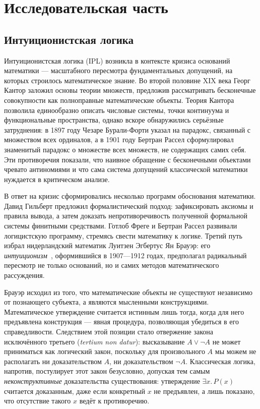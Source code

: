 \documentclass[14pt, russian]{scrartcl}
\begin{document}
\section{Исследовательская часть}

\subsection{Интуиционистская логика}

Интуиционистская логика (IPL) возникла в контексте кризиса оснований математики ---
масштабного пересмотра фундаментальных допущений, на которых строилось
математическое знание. Во второй половине XIX века Георг Кантор заложил основы
теории множеств, предложив рассматривать бесконечные совокупности как
полноправные математические объекты. Теория Кантора позволила единообразно
описать числовые системы, точки континуума и функциональные пространства, однако
вскоре обнаружились серьёзные затруднения: в 1897 году Чезаре Бурали-Форти
указал на парадокс, связанный с множеством всех ординалов, а в 1901 году
Бертран Рассел сформулировал знаменитый парадокс о множестве всех множеств, не
содержащих самих себя. Эти противоречия показали, что наивное обращение с
бесконечными объектами чревато антиномиями и что сама система допущений
классической математики нуждается в критическом анализе.

В ответ на кризис сформировались несколько программ обоснования математики.
Давид Гильберт предложил формалистический подход: зафиксировать аксиомы и
правила вывода, а затем доказать непротиворечивость полученной формальной
системы финитными средствами. Готлоб Фреге и Бертран Рассел развивали
логицистскую программу, стремясь свести математику к логике. Третий путь
избрал нидерландский математик Луитзен Эгбертус Ян Брауэр: его
\emph{интуиционизм}~\cite{Brouwer1975}, оформившийся в 1907---1912 годах,
предполагал радикальный пересмотр не только оснований, но и самих методов
математического рассуждения.

Брауэр исходил из того, что математические объекты не существуют независимо от
познающего субъекта, а являются мысленными конструкциями. Математическое
утверждение считается истинным лишь тогда, когда для него предъявлена
конструкция --- явная процедура, позволяющая убедиться в его справедливости.
Следствием этой позиции стало отвержение закона исключённого третьего
(\emph{tertium non datur}): высказывание $A \lor \neg A$ не может приниматься
как логический закон, поскольку для произвольного $A$ мы можем не располагать ни
доказательством $A$, ни доказательством $\neg A$. Классическая логика, напротив,
постулирует этот закон безусловно, допуская тем самым \emph{неконструктивные}
доказательства существования: утверждение $\exists x.\, P(x)$ считается
доказанным, даже если конкретный $x$ не предъявлен, а лишь показано, что
отсутствие такого $x$ ведёт к противоречию.
\end{document}
